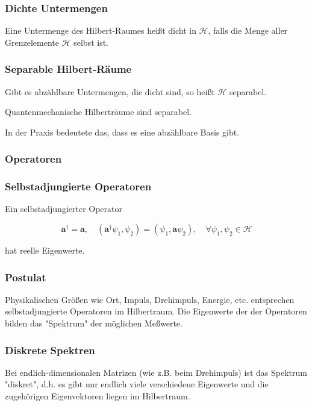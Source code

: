 \documentclass[10pt, letterpaper]{article}
\begin{document}
\subsubsection*{Dichte Untermengen}
Eine Untermenge des Hilbert-Raumes heißt dicht in $\mathcal{H}$, falls die Menge aller Grenzelemente $\mathcal{H}$ selbst ist.

\subsubsection*{Separable Hilbert-Räume}
Gibt es abzählbare Untermengen, die dicht sind, so heißt $\mathcal{H}$ separabel.

\begin{displayquote}
Quantenmechanische Hilberträume sind separabel.
\end{displayquote}

In der Praxis bedeutete das, dass es eine abzählbare Basis gibt.

\subsubsection*{Operatoren}
\subsubsection*{Selbstadjungierte Operatoren}
Ein selbstadjungierter Operator

$$
\mathbf{a}^{\dagger}=\mathbf{a}, \quad\left(\mathbf{a}^{\dagger} \psi_{1}, \psi_{2}\right)=\left(\psi_{1}, \mathbf{a} \psi_{2}\right), \quad \forall \psi_{1}, \psi_{2} \in \mathcal{H}
$$

hat reelle Eigenwerte.

\subsubsection*{Postulat}
Physikalischen Größen wie Ort, Impuls, Drehimpuls, Energie, etc. entsprechen selbstadjungierte Operatoren im Hilbertraum. Die Eigenwerte der der Operatoren bilden das "Spektrum" der möglichen Meßwerte.

\subsubsection*{Diskrete Spektren}
Bei endlich-dimensionalen Matrizen (wie z.B. beim Drehimpuls) ist das Spektrum "diskret", d.h. es gibt nur endlich viele verschiedene Eigenwerte und die zugehörigen Eigenvektoren liegen im Hilbertraum.
\end{document}
